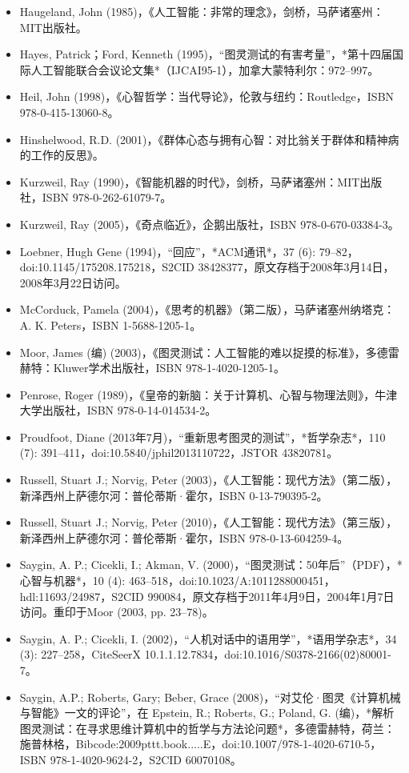 \begin{itemize}
\item Haugeland, John (1985)，《人工智能：非常的理念》，剑桥，马萨诸塞州：MIT出版社。
\item Hayes, Patrick；Ford, Kenneth (1995)，“图灵测试的有害考量”，*第十四届国际人工智能联合会议论文集*（IJCAI95-1），加拿大蒙特利尔：972–997。
\item Heil, John (1998)，《心智哲学：当代导论》，伦敦与纽约：Routledge，ISBN 978-0-415-13060-8。
\item Hinshelwood, R.D. (2001)，《群体心态与拥有心智：对比翁关于群体和精神病的工作的反思》。
\item Kurzweil, Ray (1990)，《智能机器的时代》，剑桥，马萨诸塞州：MIT出版社，ISBN 978-0-262-61079-7。
\item Kurzweil, Ray (2005)，《奇点临近》，企鹅出版社，ISBN 978-0-670-03384-3。
\item Loebner, Hugh Gene (1994)，“回应”，*ACM通讯*，37 (6): 79–82，doi:10.1145/175208.175218，S2CID 38428377，原文存档于2008年3月14日，2008年3月22日访问。
\item McCorduck, Pamela (2004)，《思考的机器》（第二版），马萨诸塞州纳塔克：A. K. Peters，ISBN 1-5688-1205-1。
\item Moor, James (编) (2003)，《图灵测试：人工智能的难以捉摸的标准》，多德雷赫特：Kluwer学术出版社，ISBN 978-1-4020-1205-1。
\item Penrose, Roger (1989)，《皇帝的新脑：关于计算机、心智与物理法则》，牛津大学出版社，ISBN 978-0-14-014534-2。
\item Proudfoot, Diane (2013年7月)，“重新思考图灵的测试”，*哲学杂志*，110 (7): 391–411，doi:10.5840/jphil2013110722，JSTOR 43820781。
\item Russell, Stuart J.; Norvig, Peter (2003)，《人工智能：现代方法》（第二版），新泽西州上萨德尔河：普伦蒂斯·霍尔，ISBN 0-13-790395-2。
\item Russell, Stuart J.; Norvig, Peter (2010)，《人工智能：现代方法》（第三版），新泽西州上萨德尔河：普伦蒂斯·霍尔，ISBN 978-0-13-604259-4。
\item Saygin, A. P.; Cicekli, I.; Akman, V. (2000)，“图灵测试：50年后”（PDF），*心智与机器*，10 (4): 463–518，doi:10.1023/A:1011288000451，hdl:11693/24987，S2CID 990084，原文存档于2011年4月9日，2004年1月7日访问。重印于Moor (2003, pp. 23–78)。
\item Saygin, A. P.; Cicekli, I. (2002)，“人机对话中的语用学”，*语用学杂志*，34 (3): 227–258，CiteSeerX 10.1.1.12.7834，doi:10.1016/S0378-2166(02)80001-7。
\item Saygin, A.P.; Roberts, Gary; Beber, Grace (2008)，“对艾伦·图灵《计算机械与智能》一文的评论”，在 Epstein, R.; Roberts, G.; Poland, G. (编)，*解析图灵测试：在寻求思维计算机中的哲学与方法论问题*，多德雷赫特，荷兰：施普林格，Bibcode:2009pttt.book.....E，doi:10.1007/978-1-4020-6710-5，ISBN 978-1-4020-9624-2，S2CID 60070108。

\end{itemize}
